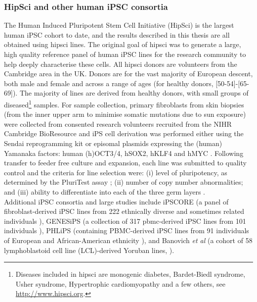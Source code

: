 \subsubsection{HipSci and other human iPSC consortia}
\label{sec:HipSci}

The Human Induced Pluripotent Stem Cell Initiative (HipSci) \cite{kilpinen2017common} is the largest human iPSC cohort to date, and the results described in this thesis are all obtained using \gls{hipsci} lines.
The original goal of \gls{hipsci} was to generate a large, high quality reference panel of human iPSC lines for the research community to help deeply characterise these cells. 
All \gls{hipsci} donors are volunteers from the Cambridge area in the UK. 
Donors are for the vast majority of European descent, both male and female and across a range of ages (for healthy donors, [50-54]-[65-69]).
The majority of lines are derived from healthy donors, with small groups of diseased\footnote{Diseases included in \gls{hipsci} are monogenic diabetes, Bardet-Biedl syndrome, Usher syndrome, Hypertrophic cardiomyopathy and a few others, see \url{http://www.hipsci.org}.} samples.
For sample collection, primary fibroblasts from skin biopsies (from the inner upper arm to minimise somatic mutations due to sun exposure) were collected from consented research volunteers recruited from the NIHR Cambridge BioResource and iPS cell derivation was performed either using the Sendai reprogramming kit or episomal plasmids expressing the (human) Yamanaka factors: human (h)OCT3/4, hSOX2, hKLF4 and hMYC \cite{yu2009human}.
Following transfer to feeder free culture and expansion, each line was submitted to quality control and the criteria for line selection were: (i) level of pluripotency, as determined by the PluriTest assay \cite{muller2011bioinformatic}; (ii) number of copy number abnormalities; and (iii) ability to differentiate into each of the three germ layers \cite{kilpinen2017common}. \\


Additional iPSC consortia and large studies include
iPSCORE (a panel of fibroblast-derived iPSC lines from 222 ethnically diverse and sometimes related individuals \cite{panopoulos2017ipscore}), GENESiPS (a collection of 317 \gls{pbmc}-derived iPSC lines from 101 individuals \cite{carcamo2017analysis}), PHLiPS (containing PBMC-derived iPSC lines from 91 individuals of European and African-American ethnicity \cite{pashos2017large}), and Banovich \textit{et al} (a cohort of 58 lymphoblastoid cell line (LCL)-derived Yoruban lines, \cite{banovich2018impact}).

